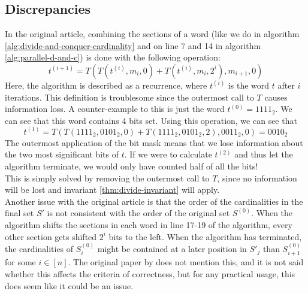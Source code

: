 \subsection{Discrepancies}
In the original article, combining the sections of a word (like we do in algorithm \ref{alg:divide-and-conquer-cardinality} and on line 7 and 14 in algorithm \ref{alg:parallel-d-and-c}) is done with the following operation:
$$t^{(i+1)}=T(T(t^{(i)}, m_i, 0) + T(t^{(i)}, m_i, 2^i), m_{i+1}, 0)$$
Here, the algorithm is described as a recurrence, where $t^{(i)}$ is the word $t$ after $i$ iterations. This definition is troublesome since the outermost call to $T$ causes information loss. A counter-example to this is just the word $t^{(0)} = 1111_2$. We can see that this word contains 4 bits set. Using this operation, we can see that 
$$t^{(1)}=T(T(1111_2, 0101_2, 0) + T(1111_2, 0101_2, 2), 0011_2, 0) = 0010_2$$
The outermost application of the bit mask means that we lose information about the two most significant bits of $t$. If we were to calculate $t^{(2)}$ and thus let the algorithm terminate, we would only have counted half of all the bits!\\
This is simply solved by removing the outermost call to $T$, since no information will be lost and invariant \ref{thm:divide-invariant} will apply.\\
Another issue with the original article is that the order of the cardinalities in the final set $S'$ is not consistent with the order of the original set $S^{(0)}$.
When the algorithm shifts the sections in each word in line 17-19 of the algorithm, every other section gets shifted $2^i$ bits to the left. 
When the algorithm has terminated, the cardinalities of $S^{(0)}_i$ might be contained at a later position in $S'_j$ than $S^{(0)}_{i+1}$ for some $i\in [n]$. The original paper by \citet{fast-similarity-search} does not mention this, and it is not said whether this affects the criteria of correctness, but for any practical usage, this does seem like it could be an issue. 

